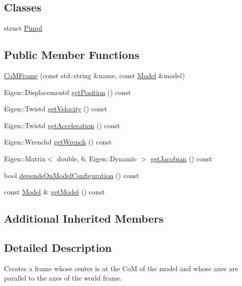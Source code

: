 \subsection*{Classes}
\begin{DoxyCompactItemize}
\item 
struct \hyperlink{structocra_1_1CoMFrame_1_1Pimpl}{Pimpl}
\end{DoxyCompactItemize}
\subsection*{Public Member Functions}
\begin{DoxyCompactItemize}
\item 
\hyperlink{classocra_1_1CoMFrame_a0b9177034d13b851238da7edfadcdf38}{Co\+M\+Frame} (const std\+::string \&name, const \hyperlink{classocra_1_1Model}{Model} \&model)
\item 
Eigen\+::\+Displacementd \hyperlink{classocra_1_1CoMFrame_ae3b6b33ff7bd3b17a27eceb295088256}{get\+Position} () const 
\item 
Eigen\+::\+Twistd \hyperlink{classocra_1_1CoMFrame_a91bdc34b84856b68c5d695da07ee81b2}{get\+Velocity} () const 
\item 
Eigen\+::\+Twistd \hyperlink{classocra_1_1CoMFrame_aac928e57293e2ea181706c2368c80881}{get\+Acceleration} () const 
\item 
Eigen\+::\+Wrenchd \hyperlink{classocra_1_1CoMFrame_a1bd72889a8fbc33ee3b6bb79e53a1403}{get\+Wrench} () const 
\item 
Eigen\+::\+Matrix$<$ double, 6, Eigen\+::\+Dynamic $>$ \hyperlink{classocra_1_1CoMFrame_aef75b76e5515357a3b7e9a7bee49b6f3}{get\+Jacobian} () const 
\item 
bool \hyperlink{classocra_1_1CoMFrame_a151f5b6bea3ec48298e1608f6052aba1}{depends\+On\+Model\+Configuration} () const 
\item 
const \hyperlink{classocra_1_1Model}{Model} \& \hyperlink{classocra_1_1CoMFrame_abe0c3fdf5bd8f853c88e4dd2c5e34ca8}{get\+Model} () const 
\end{DoxyCompactItemize}
\subsection*{Additional Inherited Members}


\subsection{Detailed Description}
Creates a frame whose center is at the CoM of the model and whose axes are parallel to the axes of the world frame. 

